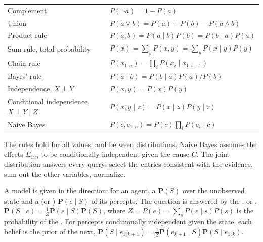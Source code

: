 \documentclass[11pt, a4paper]{exam}
\begin{document}
\begin{recap}
    \begin{center}
        \begin{tabular}{ll}
            \toprule
            Complement & $P(\neg a) = 1 - P(a)$ \\
            Union & $P(a \lor b) = P(a) + P(b) - P(a \land b)$ \\
            Product rule & $P(a, b) = P(a \mid b) P(b) = P(b \mid a) P(a)$ \\
            Sum rule, total probability & $P(x) = \sum_y P(x, y) = \sum_y P(x \mid y) P(y)$ \\
            Chain rule & $P(x_{1:n}) = \prod_i P(x_i \mid x_{1:i-1})$ \\
            Bayes' rule & $P(a \mid b) = P(b \mid a) P(a) / P(b)$ \\
            Independence, $X \perp Y$ & $P(x, y) = P(x) P(y)$ \\
            Conditional independence, $X \perp Y \mid Z$ & $P(x, y \mid z) = P(x \mid z) P(y \mid z)$ \\
            Naive Bayes & $P(c, e_{1:n}) = P(c) \prod_i P(e_i \mid c)$ \\
            \bottomrule
        \end{tabular}
    \end{center}
    The rules hold for all values, and between distributions. Naive Bayes assumes the effects $E_{1:n}$ to be conditionally independent given the cause $C$. The joint distribution answers every query: select the entries consistent with the evidence, sum out the other variables, normalize.

    A model is given in the  direction: for an agent, a  $\mathbf{P}(S)$ over the unobserved state and a  (or ) $\mathbf{P}(e \mid S)$ of its percepts. The  question is answered by the , or , $\mathbf{P}(S \mid e) = \frac{1}{Z} \mathbf{P}(e \mid S) \mathbf{P}(S)$, where ${Z = P(e) = \sum_s P(e \mid s) P(s)}$ is the probability of the . For percepts conditionally independent given the state, each belief is the prior of the next, $\mathbf{P}(S \mid e_{1:k+1}) = \frac{1}{Z} \mathbf{P}(e_{k+1} \mid S) \mathbf{P}(S \mid e_{1:k})$.
\end{recap}
\end{document}
